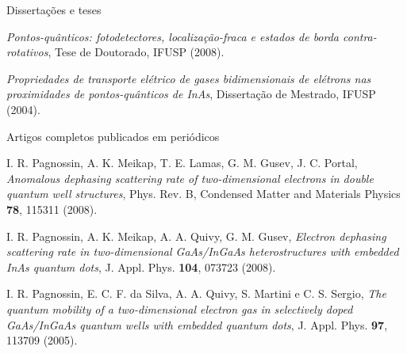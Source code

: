 \begin{compactitem}

  \item Dissertações e teses
  \begin{compactitem}
    \item \textsl{Pontos-quânticos: fotodetectores, localização-fraca e estados de borda contra-rotativos}, Tese de Doutorado, IFUSP (2008).
    \item \textsl{Propriedades de transporte elétrico de gases bidimensionais de elétrons nas proximidades de pontos-quânticos de InAs}, Dissertação de Mestrado, IFUSP (2004).
  \end{compactitem}

  \item Artigos completos publicados em periódicos
  \begin{compactitem}
    \item I. R. Pagnossin, A. K. Meikap, T. E. Lamas, G. M. Gusev, J. C. Portal, \textsl{Anomalous dephasing scattering rate of two-dimensional electrons in double quantum well structures}, Phys. Rev. B, Condensed Matter and Materials Physics \textbf{78}, 115311 (2008). 
    \item I. R. Pagnossin, A. K. Meikap, A. A. Quivy, G. M. Gusev, \textsl{Electron dephasing scattering rate in two-dimensional GaAs/InGaAs heterostructures with embedded InAs quantum dots}, J. Appl. Phys. \textbf{104}, 073723 (2008).
    \item I. R. Pagnossin, E. C. F. da Silva, A. A. Quivy, S. Martini e C. S. Sergio, \textsl{The quantum mobility of a two-dimensional electron gas in selectively doped GaAs/InGaAs quantum wells with embedded quantum dots}, J. Appl. Phys. \textbf{97}, 113709 (2005).
  \end{compactitem}
		

\end{compactitem}
